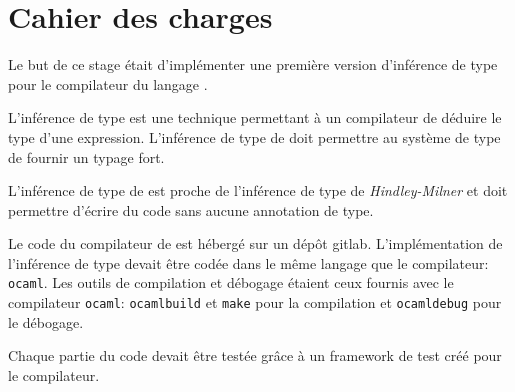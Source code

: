 \section{Cahier des charges}

Le but de ce stage était d'implémenter une première version d'inférence de type pour le compilateur
du langage \typer{}.

L'inférence de type est une technique permettant à un compilateur de déduire le type d'une expression.
L'inférence de type de \typer{} doit permettre au système de type de fournir un typage fort.

L'inférence de type de \typer{} est proche de l'inférence de type de \textit{Hindley-Milner} et doit permettre
d'écrire du code sans aucune annotation de type.

Le code du compilateur de \typer{} est hébergé sur un dépôt gitlab.
L'implémentation de l'inférence de type devait être codée dans le même langage que le compilateur: \texttt{ocaml}.
Les outils de compilation et débogage étaient ceux fournis avec le compilateur \texttt{ocaml}: \texttt{ocamlbuild} et \texttt{make}
pour la compilation et \texttt{ocamldebug} pour le débogage.

Chaque partie du code devait être testée grâce à un framework de test créé pour le compilateur.

